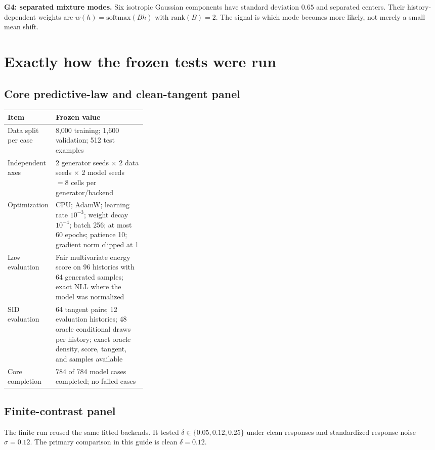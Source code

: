 \documentclass[11pt]{article}
\begin{document}
\textbf{G4: separated mixture modes.}  Six isotropic Gaussian components have
standard deviation $0.65$ and separated centers.  Their history-dependent weights are
$w(h)=\mathrm{softmax}(Bh)$ with $\mathrm{rank}(B)=2$.  The signal is which mode becomes
more likely, not merely a small mean shift.

\section{Exactly how the frozen tests were run}

\subsection{Core predictive-law and clean-tangent panel}

\begin{center}
\begin{tabularx}{0.94\linewidth}{@{}p{0.32\linewidth} X@{}}
\toprule
Item & Frozen value \\
\midrule
Data split per case & 8,000 training; 1,600 validation; 512 test examples \\
Independent axes & 2 generator seeds $\times$ 2 data seeds $\times$ 2 model seeds
$=8$ cells per generator/backend \\
Optimization & CPU; AdamW; learning rate $10^{-3}$; weight decay $10^{-4}$; batch
256; at most 60 epochs; patience 10; gradient norm clipped at 1 \\
Law evaluation & Fair multivariate energy score on 96 histories with 64 generated
samples; exact NLL where the model was normalized \\
SID evaluation & 64 tangent pairs; 12 evaluation histories; 48 oracle conditional
draws per history; exact oracle density, score, tangent, and samples available \\
Core completion & 784 of 784 model cases completed; no failed cases \\
\bottomrule
\end{tabularx}
\end{center}

\subsection{Finite-contrast panel}

The finite run reused the same fitted backends.  It tested
$\delta\in\{0.05,0.12,0.25\}$ under clean responses and standardized response noise
$\sigma=0.12$.  The primary comparison in this guide is clean $\delta=0.12$.
\end{document}
